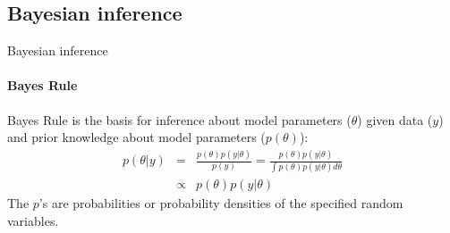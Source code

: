 \documentclass[handout]{beamer}
\begin{document}
\subsection{Bayesian inference}

\begin{frame}{Bayesian inference}
\framesubtitle{\large Bayes Rule}

\alert{Bayes Rule} is the basis for inference about model parameters ($\theta$) given data ($y$) and prior knowledge about model parameters ($p\left(\theta\right)$):
\begin{eqnarray*}
p\left(\theta|y\right) &=& \frac{p\left(\theta\right)p\left(y|\theta\right)}{p\left(y\right)}
= \frac{p\left(\theta\right)p\left(y|\theta\right)}{\int{p\left(\theta\right)p\left(y|\theta\right) d\theta}}
\\ 
&\propto& p\left(\theta\right)p\left(y|\theta\right)
\end{eqnarray*}
The $p$'s are probabilities or probability densities of the specified random variables.

\end{frame}

\end{document}
